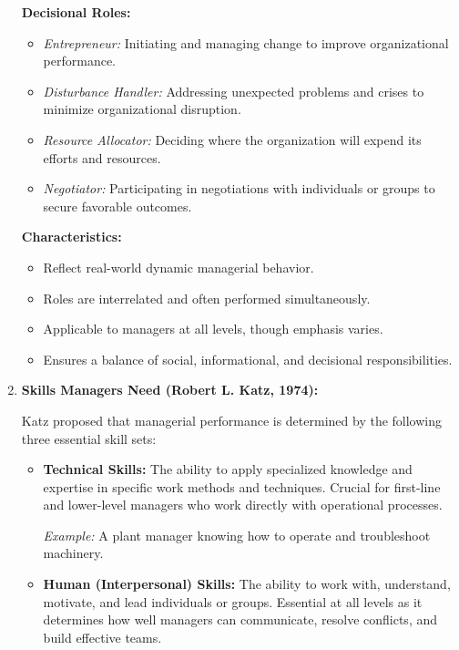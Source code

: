 \documentclass[10pt,a4paper]{book}
\begin{document}
\begin{multicols}{2}
\begin{enumerate}
    \textbf{Decisional Roles:}
    \begin{itemize}
        \item \textit{Entrepreneur:} Initiating and managing change to improve organizational performance.
        \item \textit{Disturbance Handler:} Addressing unexpected problems and crises to minimize organizational disruption.
        \item \textit{Resource Allocator:} Deciding where the organization will expend its efforts and resources.
        \item \textit{Negotiator:} Participating in negotiations with individuals or groups to secure favorable outcomes.
    \end{itemize}

    \textbf{Characteristics:}
    \begin{itemize}
        \item Reflect real-world dynamic managerial behavior.
        \item Roles are interrelated and often performed simultaneously.
        \item Applicable to managers at all levels, though emphasis varies.
        \item Ensures a balance of social, informational, and decisional responsibilities.
    \end{itemize}

    \item \textbf{Skills Managers Need (Robert L. Katz, 1974):}

    Katz proposed that managerial performance is determined by the following three essential skill sets:

    \begin{itemize}
        \item \textbf{Technical Skills:} 
        The ability to apply specialized knowledge and expertise in specific work methods and techniques. Crucial for first-line and lower-level managers who work directly with operational processes.

        \textit{Example:} A plant manager knowing how to operate and troubleshoot machinery.

        \item \textbf{Human (Interpersonal) Skills:}
        The ability to work with, understand, motivate, and lead individuals or groups. Essential at all levels as it determines how well managers can communicate, resolve conflicts, and build effective teams.


\end{itemize}
\end{enumerate}
\end{multicols}
\end{document}
